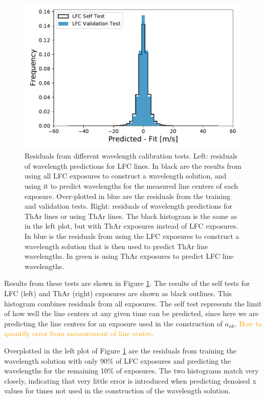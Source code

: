 \documentclass[12pt, letterpaper]{article}
\newcommand{\lz}[1]{\textcolor{orange}{#1}}
\begin{document}
\begin{figure}[h]
\centering
\includegraphics[width=1\textwidth]{Figures/lfcgood.pdf}
\caption{Residuals from different wavelength calibration tests.  Left: residuals of wavelength predictions for LFC lines.  In black are the results from using all LFC exposures to construct a wavelength solution, and using it to predict wavelengths for the measured line centers of each exposure.  Over-plotted in blue are the residuals from the training and validation tests.
Right: residuals of wavelength predictions for ThAr lines or using ThAr lines.  The black histogram is the same as in the left plot, but with ThAr exposures instead of LFC exposures.  In blue is the residuals from using the LFC exposures to construct a wavelength solution that is then used to predict ThAr line wavelengths.  In green is using ThAr exposures to predict LFC line wavelengths. }
\label{fig:testHists}
\end{figure} 

Results from these tests are shown in Figure \ref{fig:testHists}.  The results of the self tests for LFC (left) and ThAr (right) exposures are shown as black outlines.  This histogram combines residuals from all exposures.  The self test represents the limit of how well the line centers at any given time can be predicted, since here we are predicting the line centers for an exposure used in the construction of $a_{nk}$.  \lz{How to quantify error from measurement of line center}.

Overplotted in the left plot of Figure \ref{fig:testHists} are the residuals from training the wavelength solution with only 90\% of LFC exposures and predicting the wavelengths for the remaining 10\% of exposures.  The two histograms match very closely, indicating that very little error is introduced when predicting denoised x values for times not used in the construction of the wavelength solution.
\end{document}

